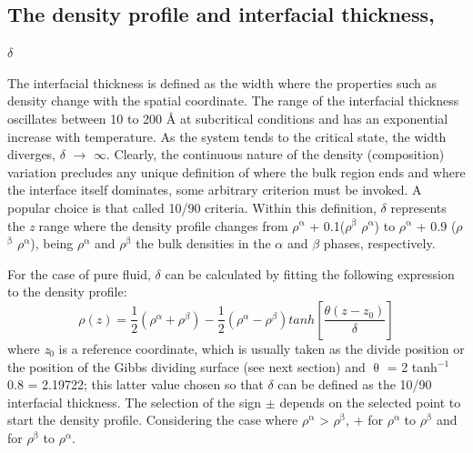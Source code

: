 \documentclass{scrbook}
\begin{document}
\subsection{The density profile and interfacial thickness,} {${\delta}$}

The interfacial thickness is defined as the width where the properties such as
density change with the spatial coordinate. The range of the interfacial
thickness oscillates between 10 to 200 \AA{} at subcritical conditions and has
an exponential increase with temperature. As the system tends to the critical
state, the width diverges, {${\delta}$} ${\rightarrow}$ ${\infty}$. Clearly,
the continuous nature of the density (composition) variation precludes any
unique definition of where the bulk region ends and where the interface itself
dominates, some arbitrary criterion must be invoked. A popular choice is that
called 10/90 criteria. Within this definition, {${\delta}$} represents the
\textit{z} range where the density profile changes from
${\rho}$$^{\mathrm{{\upalpha}}}$ + 0.1(${\rho}$$^{\mathrm{{\upbeta}}}$
\textendash{} ${\rho}$$^{\mathrm{{\upalpha}}}$) to
${\rho}$$^{\mathrm{{\upalpha}}}$ + 0.9 (${\rho}$$^{\mathrm{{\upbeta}}}$
\textendash{} ${\rho}$$^{\mathrm{{\upalpha}}}$), being
${\rho}$$^{\mathrm{{\upalpha}}}$ and ${\rho}$$^{\mathrm{{\upbeta}}}$ the bulk
densities in the {${\alpha}$} and {${\beta}$} phases, respectively.

For the case of pure fluid, {${\delta}$} can be calculated by fitting the following expression to the density profile\citep{evans1992}:
\begin{equation}
\rho\left(z\right)=\frac{1}{2}\left(\rho^{\alpha}+\rho^{\beta}\right)-\frac{1}{2}\left(\rho^{\alpha}-\rho^{\beta}\right)tanh\left[\frac{\theta\left(z-z_{0}\right)}{\delta}\right]
\end{equation}
where \textit{z}$_{0}$ is a reference coordinate, which is usually taken as the
divide position or the position of the Gibbs dividing surface (see next
section) and {${\uptheta}$} = 2 tanh$^{-1}$ 0.8 = 2.19722; this latter value
chosen so that {${\delta}$} can be defined as the 10/90 interfacial thickness.
The selection of the sign ${\pm}$ depends on the selected point to start the
density profile. Considering the case where ${\rho}$$^{\mathrm{{\upalpha}}}$
{\textgreater} ${\rho}$$^{\mathrm{{\upbeta}}}$,  + for
${\rho}$$^{\mathrm{{\upalpha}}}$ to ${\rho}$$^{\mathrm{{\upbeta}}}$ and
\textendash{} for ${\rho}$$^{\mathrm{{\upbeta}}}$ to
${\rho}$$^{\mathrm{{\upalpha}}}$.
\end{document}
